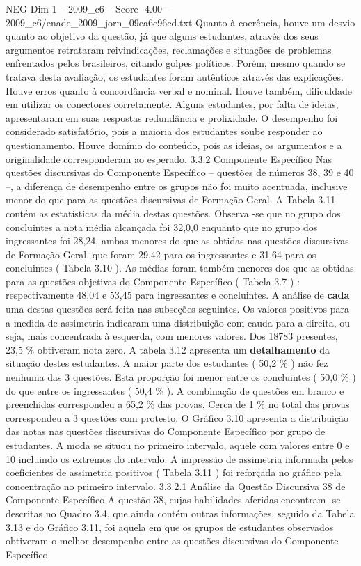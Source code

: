 \begin{textsample}{NEG Dim 1 – 2009\_c6 – Score -4.00 – 2009\_c6/enade\_2009\_jorn\_09ea6e96cd.txt}
Quanto à coerência, houve um desvio quanto ao objetivo da questão, já que alguns estudantes, através dos seus argumentos retrataram reivindicações, reclamações e situações de problemas enfrentados pelos brasileiros, citando golpes políticos.
Porém, mesmo quando se tratava desta avaliação, os estudantes foram autênticos através das explicações.
Houve erros quanto à concordância verbal e nominal.
Houve também, dificuldade em utilizar os conectores corretamente.
Alguns estudantes, por falta de ideias, apresentaram em suas respostas redundância e prolixidade.
O desempenho foi considerado satisfatório, pois a maioria dos estudantes soube responder ao questionamento.
Houve domínio do conteúdo, pois as ideias, os argumentos e a originalidade corresponderam ao esperado. 3.3.2 Componente Específico Nas questões discursivas do Componente Específico – questões de números 38, 39 e 40 –, a diferença de desempenho entre os grupos não foi muito acentuada, inclusive menor do que para as questões discursivas de Formação Geral.
A Tabela 3.11 contém as estatísticas da média destas questões.
Observa -se que no grupo dos concluintes a nota média alcançada foi 32,0,0 enquanto que no grupo dos ingressantes foi 28,24, ambas menores do que as obtidas nas questões discursivas de Formação Geral, que foram 29,42 para os ingressantes e 31,64 para os concluintes ( Tabela 3.10 ).
As médias foram também menores dos que as obtidas para as questões objetivas do Componente Específico ( Tabela 3.7 ) : respectivamente 48,04 e 53,45 para ingressantes e concluintes.
A análise de \textbf{cada} uma destas questões será feita nas subseções seguintes.
Os valores positivos para a medida de assimetria indicaram uma distribuição com cauda para a direita, ou seja, mais concentrada à esquerda, com menores valores.
Dos 18783 presentes, 23,5 \% obtiveram nota zero.
A tabela 3.12 apresenta um \textbf{detalhamento} da situação destes estudantes.
A maior parte dos estudantes ( 50,2 \% ) não fez nenhuma das 3 questões.
Esta proporção foi menor entre os concluintes ( 50,0 \% ) do que entre os ingressantes ( 50,4 \% ).
A combinação de questões em branco e preenchidas correspondeu a 65,2 \% das provas.
Cerca de 1 \% no total das provas correspondeu a 3 questões com protesto.
O Gráfico 3.10 apresenta a distribuição das notas nas questões discursivas do Componente Específico por grupo de estudantes.
A moda se situou no primeiro intervalo, aquele com valores entre 0 e 10 incluindo os extremos do intervalo.
A impressão de assimetria informada pelos coeficientes de assimetria positivos ( Tabela 3.11 ) foi reforçada no gráfico pela concentração no primeiro intervalo. 3.3.2.1 Análise da Questão Discursiva 38 de Componente Específico A questão 38, cujas habilidades aferidas encontram -se descritas no Quadro 3.4, que ainda contém outras informações, seguido da Tabela 3.13 e do Gráfico 3.11, foi aquela em que os grupos de estudantes observados obtiveram o melhor desempenho entre as questões discursivas do Componente Específico.

\end{textsample}

